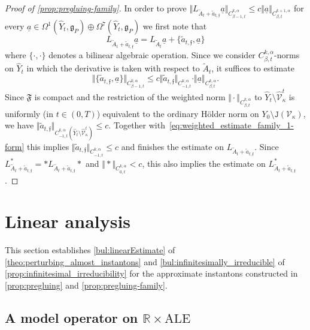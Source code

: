 \documentclass[11pt,a4paper]{scrartcl}
\newcommand{\VertWHt}[3]{\Vert_{C^{{#1},\alpha}_{{#2},t}{#3}}}
\numberwithin{equation}{section}
\theoremstyle{plain}
\theoremstyle{definition}
\theoremstyle{remark}
\begin{document}
\begin{proof}[Proof of \autoref{prop:pregluing-family}]
In order to prove $\Vert L_{\tilde{A}_t+\tilde{a}_{t,\mathfrak{f}}} \underline{a} \VertWHt{k}{\beta-1}{} \leq c \Vert \underline{a} \VertWHt{k+1}{\beta}{}$ for every $\underline{a}\in \Omega^1(\hat{Y}_t,\mathfrak{g}_P)\oplus \Omega^7(\hat{Y}_t,\mathfrak{g}_P)$ we first note that \[L_{\tilde{A}_t+\tilde{a}_{t,\mathfrak{f}}}\underline{a} = L_{\tilde{A}_t} \underline{a} + \{\tilde{a}_{t,\mathfrak{f}},\underline{a}\} \] where $\{ \cdot, \cdot \}$ denotes a bilinear algebraic operation. Since we consider $C^{k,\alpha}_{\beta,t}$-norms on $\hat{Y}_t$ in which the derivative is taken with respect to $\tilde{A}_t$, it suffices to estimate \[ \Vert \{\tilde{a}_{t,\mathfrak{f}} , \underline{a} \} \VertWHt{k}{\beta-1}{} \leq c \Vert \tilde{a}_{t,\mathfrak{f}} \VertWHt{k}{-1}{} \cdot \Vert \underline{a} \VertWHt{k}{\beta}{}.\] Since $\mathfrak{F}$ is compact and the restriction of the weighted norm $\Vert \cdot \VertWHt{k}{\beta}{}$ to $\hat{Y}_t \setminus \hat{\mathcal{V}}_{\kappa}^t$ is uniformly (in $t\in (0,T)$) equivalent to the ordinary Hölder norm on $Y_0 \setminus \mathtt{J}(\mathcal{V}_{\kappa})$, we have $\Vert \tilde{a}_{t,\mathfrak{f}} \VertWHt{k}{-1}{(\hat{Y}_t \setminus \hat{\mathcal{V}}_{\kappa}^t)} \leq c$. Together with~\eqref{eq:weighted_estimate_family_1-form} this implies $\Vert \tilde{a}_{t,\mathfrak{f}} \VertWHt{k}{-1}{} \leq c$ and finishes the estimate on $L_{\tilde{A}_t + \tilde{a}_{t,\mathfrak{f}}}$. Since $L_{\tilde{A}_t + \tilde{a}_{t,\mathfrak{f}}}^* = *L_{\tilde{A}_t + \tilde{a}_{t,\mathfrak{f}}}*$ and $\Vert * \VertWHt{k}{0}{} < c$, this also implies the estimate on $L_{\tilde{A}_t + \tilde{a}_{t,\mathfrak{f}}}^*$.
\end{proof}


\section{Linear analysis} \label{sec: linear analysis}

This section establishes \autoref{bul:linearEstimate} of \autoref{theo:perturbing_almost_instantons} and \autoref{bul:infinitesimally_irreducible} of \autoref{prop:infinitesimal_irreducibility} for the approximate instantons constructed in \autoref{prop:pregluing} and \autoref{prop:pregluing-family}.

\subsection{A model operator on $\mathbb{R}\times\text{ALE}$}
\end{document}
